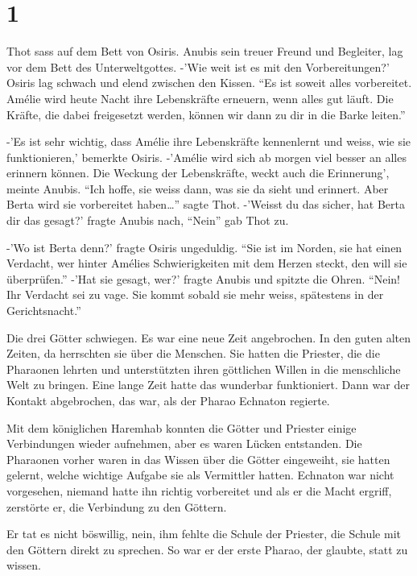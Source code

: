 \documentclass[11pt,titlepage,a5paper]{book}
\begin{document}
\section*{1}

Thot sass auf dem Bett von Osiris. Anubis sein treuer Freund und Begleiter, lag vor dem Bett des Unterweltgottes. -'Wie weit ist es mit den Vorbereitungen?' Osiris lag schwach und elend zwischen den Kissen. "`Es ist soweit alles vorbereitet. Amélie wird heute Nacht ihre Lebenskräfte erneuern, wenn alles gut läuft. Die Kräfte, die dabei freigesetzt werden, können wir dann zu dir in die Barke leiten."'

-'Es ist sehr wichtig, dass Amélie ihre Lebenskräfte kennenlernt und weiss, wie sie funktionieren,' bemerkte Osiris. -'Amélie wird sich ab morgen viel besser an alles erinnern können. Die Weckung der Lebenskräfte, weckt auch die Erinnerung', meinte Anubis. "`Ich hoffe, sie weiss dann, was sie da sieht und erinnert. Aber Berta wird sie vorbereitet haben\dots"' sagte Thot. -'Weisst du das sicher, hat Berta dir das gesagt?' fragte Anubis nach, "`Nein"' gab Thot zu. 

-'Wo ist Berta denn?' fragte Osiris ungeduldig. "`Sie ist im Norden, sie hat einen Verdacht, wer hinter Amélies Schwierigkeiten mit dem Herzen steckt, den will sie überprüfen."' -'Hat sie gesagt, wer?' fragte Anubis und spitzte die Ohren. "`Nein! Ihr Verdacht sei zu vage. Sie kommt sobald sie mehr weiss, spätestens in der Gerichtsnacht."'

Die drei Götter schwiegen. Es war eine neue Zeit angebrochen. In den guten alten Zeiten, da herrschten sie über die Menschen. Sie hatten die Priester, die die Pharaonen lehrten und unterstützten ihren göttlichen Willen in die menschliche Welt zu bringen. Eine lange Zeit hatte das wunderbar funktioniert. Dann war der Kontakt abgebrochen, das war, als der Pharao Echnaton regierte.

Mit dem königlichen Haremhab konnten die Götter und Priester einige Verbindungen wieder aufnehmen, aber es waren Lücken entstanden. Die Pharaonen vorher waren in das Wissen über die Götter eingeweiht, sie hatten gelernt, welche wichtige Aufgabe sie als Vermittler hatten. Echnaton war nicht vorgesehen, niemand hatte ihn richtig vorbereitet und als er die Macht ergriff, zerstörte er, die Verbindung zu den Göttern.

Er tat es nicht böswillig, nein, ihm fehlte die Schule der Priester, die Schule mit den Göttern direkt zu sprechen. So war er der erste Pharao, der glaubte, statt zu wissen. 
\end{document}
